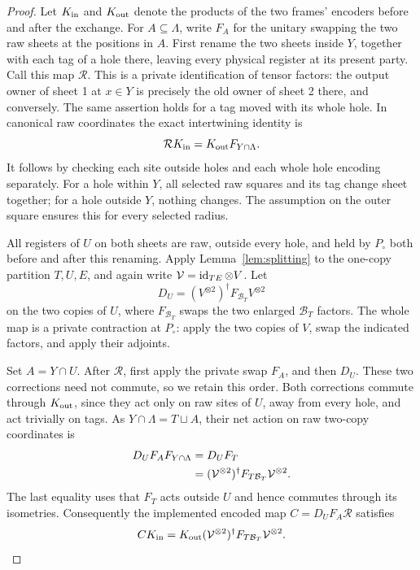 \begin{proof}
Let $K_{\rm in}$ and $K_{\rm out}$ denote the products of the two frames'
encoders before and after the exchange.  For $A\subseteq\Lambda$, write
$F_A$ for the unitary swapping the two raw sheets at the positions in $A$.
First rename the two sheets inside $Y$, together with each tag of a hole
there, leaving every physical register at its present party.  Call this
map $\mathcal R$.  This is a private identification of tensor factors: the
output owner of sheet 1 at $x\in Y$ is precisely the old owner of sheet 2
there, and conversely.  The same assertion holds for a tag moved with its
whole hole.  In canonical raw coordinates the exact intertwining identity
is
\begin{equation}\label{eq:exchange-intertwining}
  \mathcal R K_{\rm in}=K_{\rm out}F_{Y\cap\Lambda}.
\end{equation}
It follows by checking each site outside holes and each whole hole
encoding separately.  For a hole within $Y$, all selected raw squares and
its tag change sheet together; for a hole outside $Y$, nothing changes.
The assumption on the outer square ensures this for every selected radius.

All registers of $U$ on both sheets are raw, outside every hole, and held
by $P_\circ$ both before and after this renaming.  Apply
Lemma~\ref{lem:splitting} to the one-copy partition $T,U,E$, and again write
$\mathcal V=\operatorname{id}_{TE}\otimes V$.  Let
\begin{equation}\label{eq:exchange-buffer-correction}
 D_U=(V^{\otimes2})^{\dagger}F_{\mathcal B_T}V^{\otimes2}
\end{equation}
on the two copies of $U$, where $F_{\mathcal B_T}$ swaps the two enlarged
$\mathcal B_T$ factors.  The whole map is a private contraction at
$P_\circ$: apply the two copies of $V$, swap the indicated factors, and
apply their adjoints.

Set $A=Y\cap U$.  After $\mathcal R$, first apply the private swap $F_A$,
and then $D_U$.  These two corrections need not commute, so we retain this
order.  Both corrections commute through $K_{\rm out}$, since they act
only on raw sites of $U$, away from every hole, and act trivially on tags.
As $Y\cap\Lambda=T\sqcup A$, their net action on raw two-copy coordinates
is
\begin{align}
 D_UF_AF_{Y\cap\Lambda}
   &=D_UF_T\notag\\
   &=(\mathcal V^{\otimes2})^{\dagger}
          F_{T\mathcal B_T}\mathcal V^{\otimes2}.
              \label{eq:exchange-net-map}
\end{align}
The last equality uses that $F_T$ acts outside $U$ and hence commutes
through its isometries.  Consequently the implemented encoded map
$C=D_UF_A\mathcal R$ satisfies
\begin{equation}\label{eq:exchange-exact-map}
 CK_{\rm in}
   =K_{\rm out}(\mathcal V^{\otimes2})^{\dagger}
                   F_{T\mathcal B_T}\mathcal V^{\otimes2}.
\end{equation}


\end{proof}
